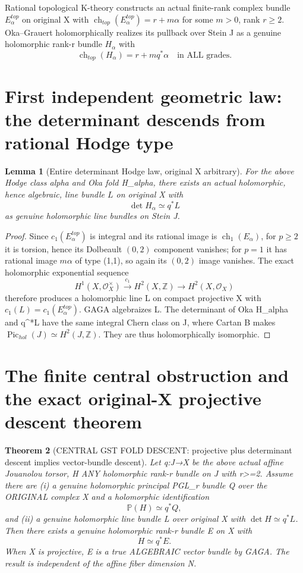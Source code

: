 \documentclass[11pt]{article}
\newtheorem{theorem}{Theorem}
\newtheorem{lemma}[theorem]{Lemma}
\begin{document}
Rational topological K-theory constructs
an actual finite-rank complex bundle $E_\alpha^{top}$
on original X with
$\operatorname{ch}_{top}(E_\alpha^{top})=r+m\alpha$
for some $m>0$, rank $r\ge2$.
Oka--Grauert holomorphically realizes its
pullback over Stein J as a genuine
holomorphic rank-r bundle $H_\alpha$ with
\[
 \boxed{
 \operatorname{ch}_{top}(H_\alpha)
      =r+m q^*\alpha\quad\text{in ALL grades}.
 }                                                       \tag{2}
\]

\section{First independent geometric law: the determinant descends from rational Hodge type}

\begin{lemma}[Entire determinant Hodge law, original X arbitrary]
For the above Hodge class alpha and Oka
fold H_alpha, there exists an actual
holomorphic, hence algebraic, line bundle
$L$ on original X with
\[
 \boxed{\det H_\alpha\simeq q^*L}
                                                             \tag{3}
\]
as genuine holomorphic line bundles on Stein J.
\end{lemma}
\begin{proof}
Since $c_1(E_\alpha^{top})$ is integral and
its rational image is $\operatorname{ch}_1(E_\alpha)$,
for $p\ge2$ it is torsion, hence its Dolbeault
$(0,2)$ component vanishes; for $p=1$ it
has rational image $m\alpha$ of type (1,1),
so again its $(0,2)$ image vanishes.
The exact holomorphic exponential sequence
\[
 H^1(X,\mathcal O_X^\times)
 \xrightarrow{c_1}H^2(X,\mathbb Z)
 \longrightarrow H^2(X,\mathcal O_X)
\]
therefore produces a holomorphic line
L on compact projective X with
$c_1(L)=c_1(E_\alpha^{top})$.
GAGA algebraizes L.
The determinant of Oka H_alpha and q^*L
have the same integral Chern class on J,
where Cartan B makes
$\operatorname{Pic}_{hol}(J)
\simeq H^2(J,\mathbb Z)$.
They are thus holomorphically isomorphic.
\end{proof}

\section{The finite central obstruction and the exact original-X projective descent theorem}

\begin{theorem}[CENTRAL GST FOLD DESCENT: projective plus determinant descent implies vector-bundle descent]
Let q:J→X be the above actual
affine Jouanolou torsor, H ANY
holomorphic rank-r bundle on J
with r>=2.
Assume there are
(i) a genuine holomorphic principal PGL_r
bundle Q over the ORIGINAL complex X
and a holomorphic identification
\[
 \mathbb P(H)\simeq q^*Q,
                                                             \tag{4}
\]
and (ii) a genuine holomorphic
line bundle L over original X
with $\det H\simeq q^*L$.
Then there exists a genuine
holomorphic rank-r bundle E on X
with
\[
 \boxed{H\simeq q^*E}.
                                                             \tag{5}
\]
When X is projective, E is a true
ALGEBRAIC vector bundle by GAGA.
The result is independent of
the affine fiber dimension N.
\end{theorem}
\end{document}
